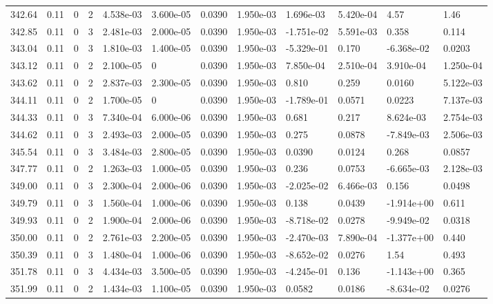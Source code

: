 \documentclass[preview]{standalone}
\begin{document}
{{{{{{{{{{{\begin{tabular}{L{1.2cm}C{1.2cm} C{0.3cm}C{0.5cm} C{1.4cm}C{1.4cm} C{1.4cm}C{1.4cm} C{1.6cm}C{1.6cm} C{1.6cm}C{1.6cm}}
  342.64  &  0.11  & 0     &  2 &  4.538e-03  & 3.600e-05  &  0.0390&   1.950e-03& 1.696e-03 & 5.420e-04   &  4.57 & 1.46  \\ 
  342.85  &  0.11  & 0     &  3 &  2.481e-03  & 2.000e-05  &  0.0390&   1.950e-03& -1.751e-02 & 5.591e-03   &  0.358 & 0.114  \\ 
  343.04  &  0.11  & 0     &  3 &  1.810e-03  & 1.400e-05  &  0.0390&   1.950e-03& -5.329e-01 & 0.170   &  -6.368e-02 & 0.0203  \\ 
  343.12  &  0.11  & 0     &  2 &  2.100e-05  & 0  &  0.0390&   1.950e-03& 7.850e-04 & 2.510e-04   &  3.910e-04 & 1.250e-04  \\ 
  343.62  &  0.11  & 0     &  2 &  2.837e-03  & 2.300e-05  &  0.0390&   1.950e-03& 0.810 & 0.259   &  0.0160 & 5.122e-03  \\ 
  344.11  &  0.11  & 0     &  2 &  1.700e-05  & 0  &  0.0390&   1.950e-03& -1.789e-01 & 0.0571   &  0.0223 & 7.137e-03  \\ 
  344.33  &  0.11  & 0     &  3 &  7.340e-04  & 6.000e-06  &  0.0390&   1.950e-03& 0.681 & 0.217   &  8.624e-03 & 2.754e-03  \\ 
  344.62  &  0.11  & 0     &  3 &  2.493e-03  & 2.000e-05  &  0.0390&   1.950e-03& 0.275 & 0.0878   &  -7.849e-03 & 2.506e-03  \\ 
  345.54  &  0.11  & 0     &  3 &  3.484e-03  & 2.800e-05  &  0.0390&   1.950e-03& 0.0390 & 0.0124   &  0.268 & 0.0857  \\ 
  347.77  &  0.11  & 0     &  2 &  1.263e-03  & 1.000e-05  &  0.0390&   1.950e-03& 0.236 & 0.0753   &  -6.665e-03 & 2.128e-03  \\ 
  349.00  &  0.11  & 0     &  3 &  2.300e-04  & 2.000e-06  &  0.0390&   1.950e-03& -2.025e-02 & 6.466e-03   &  0.156 & 0.0498  \\ 
  349.79  &  0.11  & 0     &  3 &  1.560e-04  & 1.000e-06  &  0.0390&   1.950e-03& 0.138 & 0.0439   &  -1.914e+00 & 0.611  \\ 
  349.93  &  0.11  & 0     &  2 &  1.900e-04  & 2.000e-06  &  0.0390&   1.950e-03& -8.718e-02 & 0.0278   &  -9.949e-02 & 0.0318  \\ 
  350.00  &  0.11  & 0     &  2 &  2.761e-03  & 2.200e-05  &  0.0390&   1.950e-03& -2.470e-03 & 7.890e-04   &  -1.377e+00 & 0.440  \\ 
  350.39  &  0.11  & 0     &  3 &  1.480e-04  & 1.000e-06  &  0.0390&   1.950e-03& -8.652e-02 & 0.0276   &  1.54 & 0.493  \\ 
  351.78  &  0.11  & 0     &  3 &  4.434e-03  & 3.500e-05  &  0.0390&   1.950e-03& -4.245e-01 & 0.136   &  -1.143e+00 & 0.365  \\ 
  351.99  &  0.11  & 0     &  2 &  1.434e-03  & 1.100e-05  &  0.0390&   1.950e-03& 0.0582 & 0.0186   &  -8.634e-02 & 0.0276  \\ 
\hline 
\end{tabular} 

}}}}}}}}}}}
\end{document}

